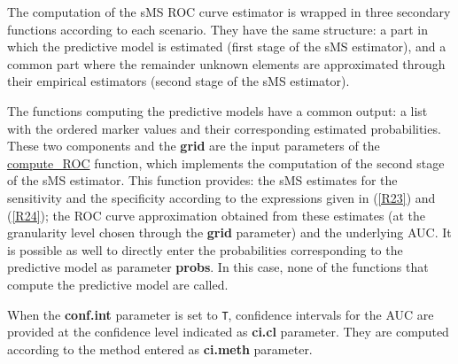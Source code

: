 The computation of the sMS ROC curve estimator is wrapped in three secondary functions according to each scenario. They have the same structure: a part in which the predictive model is estimated (first stage of the sMS estimator), 
and a common part where the remainder unknown elements are approximated through their empirical estimators (second stage of the sMS estimator).

The functions computing the predictive models have a common output: a list with the ordered marker values and their corresponding estimated probabilities. These two components and the {\textbf{grid}} are the input parameters of the \url{compute_ROC} function, which implements the computation of the second stage of the sMS estimator. This function provides: the sMS estimates for the sensitivity and the specificity according to the expressions given in (\ref{R23}) and (\ref{R24}); the ROC curve approximation obtained from these estimates (at the granularity level chosen through the {\textbf{grid}} parameter) and the underlying AUC. It is possible as well to directly enter the probabilities corresponding to the predictive model as parameter {\textbf{probs}}. In this case, none of the functions that compute the predictive model are called.

When the {\textbf{conf.int}} parameter is set to {\texttt {T}}, confidence intervals for the AUC are provided at the confidence level indicated as {\textbf{ci.cl}} parameter. They are computed according to the method entered as {\textbf{ci.meth}} parameter. 

